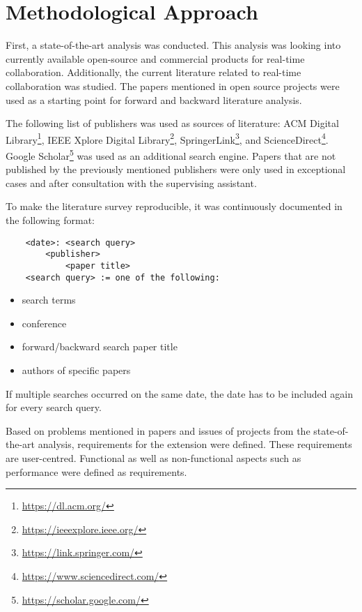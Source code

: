 \chapter{Methodological Approach}

First, a state-of-the-art analysis was conducted. This analysis was looking into currently available open-source and commercial products for real-time collaboration. 
Additionally, the current literature related to real-time collaboration was studied.
The papers mentioned in open source projects were used as a starting point for forward and backward literature analysis.


The following list of publishers was used as sources of literature: ACM Digital Library\footnote{\href{https://dl.acm.org/}{https://dl.acm.org/}}, IEEE Xplore Digital Library\footnote{\href{https://ieeexplore.ieee.org/}{https://ieeexplore.ieee.org/}}, SpringerLink\footnote{\href{https://link.springer.com/}{https://link.springer.com/}}, and ScienceDirect\footnote{\href{https://www.sciencedirect.com/}{https://www.sciencedirect.com/}}. Google Scholar\footnote{\href{https://scholar.google.com/}{https://scholar.google.com/}} was used as an additional search engine. Papers that are not published by the previously mentioned publishers were only used in exceptional cases and after consultation with the supervising assistant.


To make the literature survey reproducible, it was continuously documented in the following format:

\begin{lstlisting}
	<date>: <search query>
		<publisher>
			<paper title>
	<search query> := one of the following:
\end{lstlisting}

\begin{itemize}
    \item search terms
    \item conference
    \item forward/backward search paper title
    \item authors of specific papers 
\end{itemize}
If multiple searches occurred on the same date, the date has to be included again for every search query.

Based on problems mentioned in papers and issues of projects from the state-of-the-art analysis, requirements for the extension were defined.
These requirements are user-centred.
Functional as well as non-functional aspects such as performance were defined as requirements.

